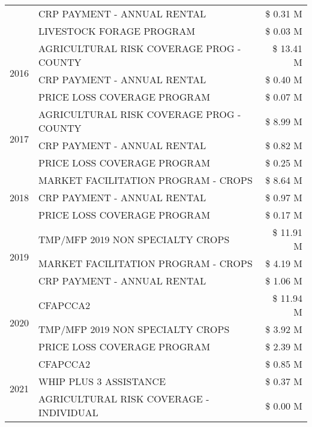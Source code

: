 \begin{tabular}{llr}
 & CRP PAYMENT - ANNUAL RENTAL & \$ 0.31 M \\
 & LIVESTOCK FORAGE PROGRAM & \$ 0.03 M \\
\cline{1-3}
\multirow[t]{3}{*}{2016} & AGRICULTURAL RISK COVERAGE PROG - COUNTY      & \$ 13.41 M \\
 & CRP PAYMENT - ANNUAL RENTAL                   & \$ 0.40 M \\
 & PRICE LOSS COVERAGE PROGRAM                   & \$ 0.07 M \\
\cline{1-3}
\multirow[t]{3}{*}{2017} & AGRICULTURAL RISK COVERAGE PROG - COUNTY & \$ 8.99 M \\
 & CRP PAYMENT - ANNUAL RENTAL & \$ 0.82 M \\
 & PRICE LOSS COVERAGE PROGRAM & \$ 0.25 M \\
\cline{1-3}
\multirow[t]{3}{*}{2018} & MARKET FACILITATION PROGRAM - CROPS & \$ 8.64 M \\
 & CRP PAYMENT - ANNUAL RENTAL & \$ 0.97 M \\
 & PRICE LOSS COVERAGE PROGRAM & \$ 0.17 M \\
\cline{1-3}
\multirow[t]{3}{*}{2019} & TMP/MFP 2019 NON SPECIALTY CROPS & \$ 11.91 M \\
 & MARKET FACILITATION PROGRAM - CROPS & \$ 4.19 M \\
 & CRP PAYMENT - ANNUAL RENTAL & \$ 1.06 M \\
\cline{1-3}
\multirow[t]{3}{*}{2020} & CFAPCCA2 & \$ 11.94 M \\
 & TMP/MFP 2019 NON SPECIALTY CROPS & \$ 3.92 M \\
 & PRICE LOSS COVERAGE PROGRAM & \$ 2.39 M \\
\cline{1-3}
\multirow[t]{3}{*}{2021} & CFAPCCA2 & \$ 0.85 M \\
 & WHIP PLUS 3 ASSISTANCE & \$ 0.37 M \\
 & AGRICULTURAL RISK COVERAGE - INDIVIDUAL & \$ 0.00 M \\
\cline{1-3}
\bottomrule
\end{tabular}
